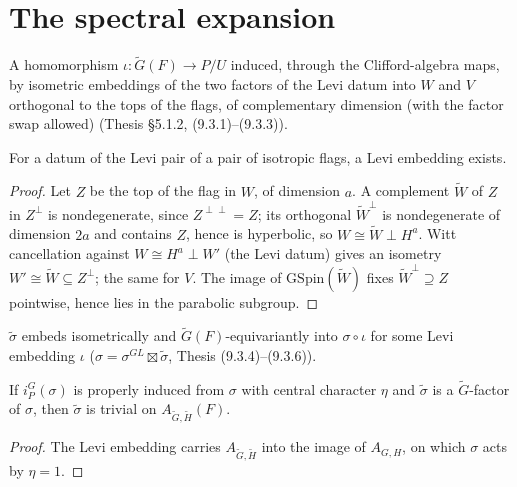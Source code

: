 \section{The spectral expansion}
\begin{definition}
\label{IsLeviEmbedding}
\leanok
{}
A homomorphism $\iota:\tilde G(F)\to P/U$ induced, through the Clifford-algebra maps, by isometric embeddings of the
two factors of the Levi datum into $W$ and $V$ orthogonal to the tops of the flags, of complementary dimension
(with the factor swap allowed) (Thesis \S5.1.2, (9.3.1)--(9.3.3)).
\end{definition}

\begin{lemma}
\label{exists_isLeviEmbedding}
\leanok
{}
For a datum of the Levi pair of a pair of isotropic flags, a Levi embedding exists.
\end{lemma}
\begin{proof}
\leanok
Let $Z$ be the top of the flag in $W$, of dimension $a$. A complement $\tilde W$ of $Z$ in $Z^\perp$ is
nondegenerate, since $Z^{\perp\perp}=Z$; its orthogonal $\tilde W^\perp$ is nondegenerate of dimension $2a$ and
contains $Z$, hence is hyperbolic, so $W\cong\tilde W\perp H^a$. Witt cancellation against
$W\cong H^a\perp W'$ (the Levi datum) gives an isometry $W'\cong\tilde W\subseteq Z^\perp$; the same for $V$.
The image of $\mathrm{GSpin}(\tilde W)$ fixes $\tilde W^\perp\supseteq Z$ pointwise, hence lies in the
parabolic subgroup.
\end{proof}

\begin{definition}
\label{IsLeviFactor}
\leanok
{}
$\tilde\sigma$ embeds isometrically and $\tilde G(F)$-equivariantly into $\sigma\circ\iota$ for some Levi
embedding $\iota$ ($\sigma=\sigma^{GL}\boxtimes\tilde\sigma$, Thesis (9.3.4)--(9.3.6)).
\end{definition}

\begin{lemma}
\label{isTrivialOn_AGH_of_isLeviFactor}
\leanok
{}
If $i_P^G(\sigma)$ is properly induced from $\sigma$ with central character $\eta$ and $\tilde\sigma$ is a
$\tilde G$-factor of $\sigma$, then $\tilde\sigma$ is trivial on $A_{\tilde G,\tilde H}(F)$.
\end{lemma}
\begin{proof}
\leanok
The Levi embedding carries $A_{\tilde G,\tilde H}$ into the image of $A_{G,H}$, on which $\sigma$ acts by
$\eta=1$.
\end{proof}

